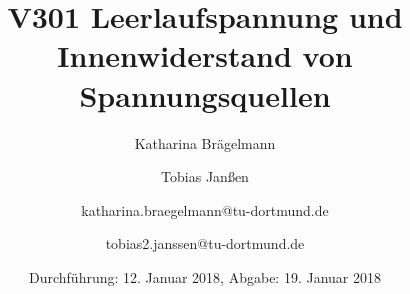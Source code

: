 
\title{V301 Leerlaufspannung und Innenwiderstand von Spannungsquellen}
\author{Katharina Brägelmann \and Tobias Janßen \and katharina.braegelmann@tu-dortmund.de \and tobias2.janssen@tu-dortmund.de}
\date{Durchführung: 12. Januar 2018, Abgabe: 19. Januar 2018}
\maketitle

\tableofcontents
